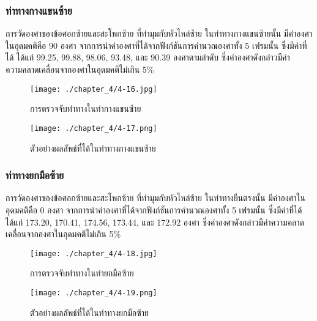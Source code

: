 \subsubsection{ท่าทางกางแขนซ้าย}
การวัดองศาของข้อศอกซ้ายและสะโพกซ้าย ที่ทำมุมกับหัวไหล่ซ้าย ในท่าทางกางแขนซ้ายนั้น มีค่าองศาในอุดมคติคือ 90 องศา จากการนำค่าองศาที่ได้จากฟังก์ชันการคำนวณองศาทั้ง 5 เฟรมนั้น ซึ่งมีค่าที่ได้ ได้แก่ 99.25, 99.88, 98.06, 93.48, และ 90.39 องศาตามลำดับ ซึ่งค่าองศาดังกล่าวมีค่าความคลาดเคลื่อนจากองศาในอุดมคติไม่เกิน 5\%
\begin{figure}
	\texttt{[image: ./chapter\_4/4-16.jpg]}
	\caption{การตรวจจับท่าทางในท่ากางแขนซ้าย}
\end{figure}
\begin{figure}
	\texttt{[image: ./chapter\_4/4-17.png]}
	\caption{ตัวอย่างผลลัพธ์ที่ได้ในท่าทางกางแขนซ้าย}
\end{figure}
\subsubsection{ท่าทางยกมือซ้าย}
การวัดองศาของข้อศอกซ้ายและสะโพกซ้าย ที่ทำมุมกับหัวไหล่ซ้าย ในท่าทางยืนตรงนั้น มีค่าองศาในอุดมคติคือ 0 องศา จากการนำค่าองศาที่ได้จากฟังก์ชันการคำนวณองศาทั้ง 5 เฟรมนั้น ซึ่งมีค่าที่ได้ ได้แก่ 173.20, 170.41, 174.56, 173.44, และ 172.92 องศา ซึ่งค่าองศาดังกล่าวมีค่าความคลาดเคลื่อนจากองศาในอุดมคติไม่เกิน 5\%
\begin{figure}
	\texttt{[image: ./chapter\_4/4-18.jpg]}
	\caption{การตรวจจับท่าทางในท่ายกมือซ้าย}
\end{figure}
\begin{figure}
	\texttt{[image: ./chapter\_4/4-19.png]}
	\caption{ตัวอย่างผลลัพธ์ที่ได้ในท่าทางยกมือซ้าย}
\end{figure}

